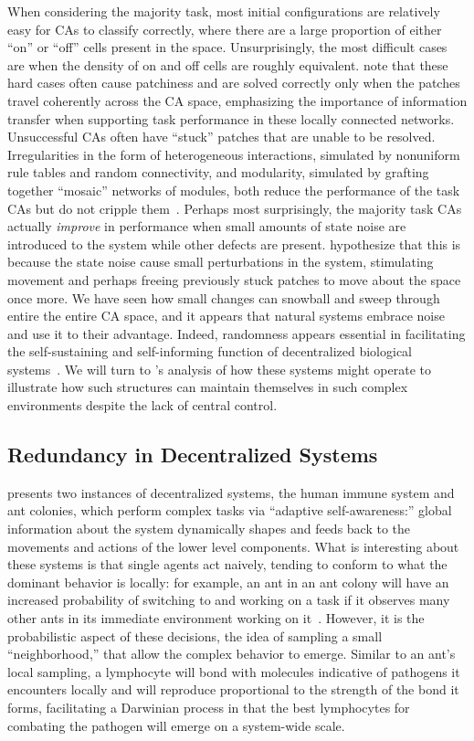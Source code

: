 \documentclass[a4paper,11pt]{report}
\begin{document}
When considering the majority task, most initial configurations are relatively easy for CAs to classify correctly, where there are a large proportion of either ``on'' or ``off'' cells present in the space. Unsurprisingly, the most difficult cases are when the density of on and off cells are roughly equivalent. \citeauthor{me07} note that these hard cases often cause patchiness and are solved correctly only when the patches travel coherently across the CA space, emphasizing the importance of information transfer when supporting task performance in these locally connected networks. Unsuccessful CAs often have ``stuck'' patches that are unable to be resolved. Irregularities in the form of heterogeneous interactions, simulated by nonuniform rule tables and random connectivity, and modularity, simulated by grafting together ``mosaic'' networks of modules, both reduce the performance of the task CAs but do not cripple them~\cite{me07}. Perhaps most surprisingly, the majority task CAs actually \textit{improve} in performance when small amounts of state noise are introduced to the system while other defects are present. \citeauthor{me07} hypothesize that this is because the state noise cause small perturbations in the system, stimulating movement and perhaps freeing previously stuck patches to move about the space once more. We have seen how small changes can snowball and sweep through entire the entire CA space, and it appears that natural systems embrace noise and use it to their advantage. Indeed, randomness appears essential in facilitating the self-sustaining and self-informing function of decentralized biological systems~\cite{mi05}. We will turn to \citeauthor{mi05}'s analysis of how these systems might operate to illustrate how such structures can maintain themselves in such complex environments despite the lack of central control.


\subsection{Redundancy in Decentralized Systems}
\citeauthor{mi05} presents two instances of decentralized systems, the human immune system and ant colonies, which perform complex tasks via ``adaptive self-awareness:'' global information about the system dynamically shapes and feeds back to the movements and actions of the lower level components. What is interesting about these systems is that single agents act naively, tending to conform to what the dominant behavior is locally: for example, an ant in an ant colony will have an increased probability of switching to and working on a task if it observes many other ants in its immediate environment working on it~\cite{mi05}. However, it is the probabilistic aspect of these decisions, the idea of sampling a small ``neighborhood,'' that allow the complex behavior to emerge. Similar to an ant's local sampling, a lymphocyte will bond with molecules indicative of pathogens it encounters locally and will reproduce proportional to the strength of the bond it forms, facilitating a Darwinian process in that the best lymphocytes for combating the pathogen will emerge on a system-wide scale.
\end{document}
